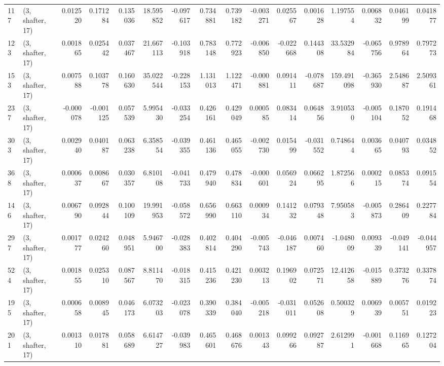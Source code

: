 \begin{tabular}{llrrrrrrrrrrrrrr}
117 &  (3, shafter, 17) &   0.012520 &  0.171284 &  0.135036 &   18.595852 & -0.097617 &   0.734881 &   0.739182 & -0.003271 &  0.025567 &  0.001628 &    1.197554 &  0.006832 &   0.046199 &   0.041877 \\
123 &  (3, shafter, 17) &   0.001865 &  0.025442 &  0.037467 &   21.667113 & -0.103918 &   0.783148 &   0.772923 & -0.006850 & -0.022668 &  0.144308 &   33.532984 & -0.065756 &   0.978964 &   0.797273 \\
153 &  (3, shafter, 17) &   0.007588 &  0.103778 &  0.160630 &   35.022544 & -0.228153 &   1.131013 &   1.122471 & -0.000881 &  0.091411 & -0.078687 &  159.491098 & -0.365930 &   2.548687 &   2.509361 \\
237 &  (3, shafter, 17) &  -0.000078 & -0.001125 &  0.057539 &    5.995430 & -0.033254 &   0.426161 &   0.429049 &  0.000585 &  0.083414 &  0.064856 &    3.910530 & -0.005104 &   0.187052 &   0.191468 \\
303 &  (3, shafter, 17) &   0.002940 &  0.040187 &  0.063238 &    6.358554 & -0.039355 &   0.461136 &   0.465055 & -0.002730 &  0.015499 & -0.031552 &    0.748644 &  0.003665 &   0.040793 &   0.034852 \\
368 &  (3, shafter, 17) &   0.000637 &  0.008667 &  0.030357 &    6.810108 & -0.041733 &   0.479940 &   0.478834 & -0.000601 &  0.056924 &  0.066295 &    1.872566 &  0.000215 &   0.085374 &   0.091554 \\
146 &  (3, shafter, 17) &   0.006790 &  0.092844 &  0.100109 &   19.991953 & -0.058572 &   0.656990 &   0.663110 &  0.000934 &  0.141232 &  0.079348 &    7.950583 & -0.005873 &   0.286409 &   0.227784 \\
297 &  (3, shafter, 17) &   0.001777 &  0.024260 &  0.048951 &    5.946700 & -0.028383 &   0.402814 &   0.404290 & -0.005743 & -0.046187 &  0.007460 &   -1.048009 &  0.009339 &  -0.049141 &  -0.044957 \\
524 &  (3, shafter, 17) &   0.001855 &  0.025310 &  0.087567 &    8.811470 & -0.018315 &   0.415236 &   0.421230 &  0.003213 &  0.196902 &  0.072571 &   12.412658 & -0.015889 &   0.373276 &   0.337874 \\
195 &  (3, shafter, 17) &   0.000658 &  0.008945 &  0.046173 &    6.073203 & -0.023078 &   0.390339 &   0.384040 & -0.005218 & -0.031011 &  0.052608 &    0.500329 &  0.006939 &   0.005751 &   0.019223 \\
201 &  (3, shafter, 17) &   0.001310 &  0.017881 &  0.058689 &    6.614727 & -0.039983 &   0.465601 &   0.468676 &  0.001343 &  0.099266 &  0.092787 &    2.612991 & -0.001668 &   0.116965 &   0.127204 \\

\end{tabular}

